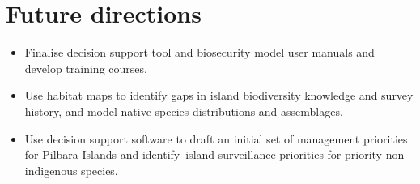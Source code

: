 \documentclass[version=last,
    paper=a4, %
    10pt, %
    usenames,
    dvipsnames,
    oneside, %
    headings=openany, %
    DIV=15 %
]{scrbook}
\begin{document}
\section*{Future directions}

\begin{itemize}
\itemsep1pt\parskip0pt
\item
  Finalise decision support tool and biosecurity model user manuals and
  develop training courses.
\item
  Use habitat maps to identify gaps in island biodiversity knowledge and
  survey history, and model native species distributions and
  assemblages.
\item
  Use decision support software to draft an initial set of management
  priorities for Pilbara Islands and identify~island surveillance
  priorities for priority non-indigenous species.
\end{itemize}



\end{document}
